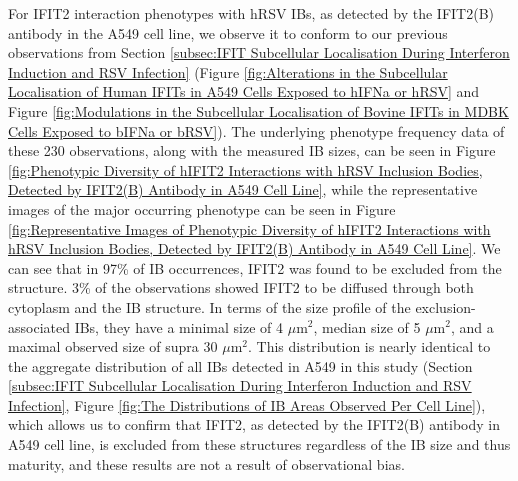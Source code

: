 For IFIT2 interaction phenotypes with hRSV IBs, as detected by the IFIT2(B) antibody in the A549 cell line, we observe it to conform to our previous observations from Section \ref{subsec:IFIT Subcellular Localisation During Interferon Induction and RSV Infection} (Figure \ref{fig:Alterations in the Subcellular Localisation of Human IFITs in A549 Cells Exposed to hIFNa or hRSV} and Figure \ref{fig:Modulations in the Subcellular Localisation of Bovine IFITs in MDBK Cells Exposed to bIFNa or bRSV}). The underlying phenotype frequency data of these 230 observations, along with the measured IB sizes, can be seen in Figure \ref{fig:Phenotypic Diversity of hIFIT2 Interactions with hRSV Inclusion Bodies, Detected by IFIT2(B) Antibody in A549 Cell Line}, while the representative images of the major occurring phenotype can be seen in Figure \ref{fig:Representative Images of Phenotypic Diversity of hIFIT2 Interactions with hRSV Inclusion Bodies, Detected by IFIT2(B) Antibody in A549 Cell Line}. We can see that in 97\% of IB occurrences, IFIT2 was found to be excluded from the structure. 3\% of the observations showed IFIT2 to be diffused through both cytoplasm and the IB structure. In terms of the size profile of the exclusion-associated IBs, they have a minimal size of 4 \(\mu \mbox{m}^2\), median size of 5 \(\mu \mbox{m}^2\), and a maximal observed size of supra 30 \(\mu \mbox{m}^2\). This distribution is nearly identical to the aggregate distribution of all IBs detected in A549 in this study (Section \ref{subsec:IFIT Subcellular Localisation During Interferon Induction and RSV Infection}, Figure \ref{fig:The Distributions of IB Areas Observed Per Cell Line}), which allows us to confirm that IFIT2, as detected by the IFIT2(B) antibody in A549 cell line, is excluded from these structures regardless of the IB size and thus maturity, and these results are not a result of observational bias.

